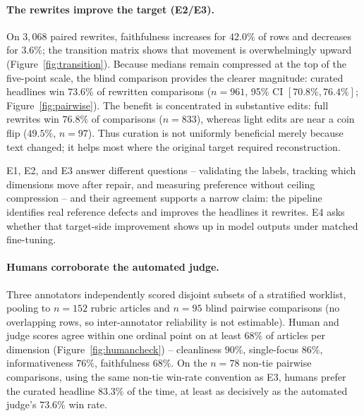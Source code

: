\documentclass[11pt]{article}
\begin{document}
\paragraph{The rewrites improve the target (E2/E3).}
On $3{,}068$ paired rewrites, faithfulness increases for $42.0\%$ of rows and decreases for $3.6\%$;
the transition matrix shows that movement is overwhelmingly upward (Figure~\ref{fig:transition}).
Because medians remain compressed at the top of the five-point scale, the blind comparison provides
the clearer magnitude: curated headlines win $73.6\%$ of rewritten comparisons
($n=961$, 95\% CI $[70.8\%,76.4\%]$; Figure~\ref{fig:pairwise}). The benefit is concentrated in
substantive edits: full rewrites win $76.8\%$ of comparisons ($n=833$), whereas light edits are near
a coin flip ($49.5\%$, $n=97$).
Thus curation is not uniformly beneficial merely because text changed; it helps most where the original
target required reconstruction.

E1, E2, and E3 answer different questions -- validating the labels, tracking which dimensions move after
repair, and measuring preference without ceiling compression -- and their agreement supports a narrow
claim: the pipeline identifies real reference defects and improves the headlines it rewrites. E4 asks
whether that target-side improvement shows up in model outputs under matched fine-tuning.

\paragraph{Humans corroborate the automated judge.}
Three annotators independently scored disjoint subsets of a stratified worklist, pooling to
$n=152$ rubric articles and $n=95$ blind pairwise comparisons (no overlapping rows, so
inter-annotator reliability is not estimable). Human and judge scores agree within one ordinal
point on at least $68\%$ of articles per dimension (Figure~\ref{fig:humancheck}) -- cleanliness
$90\%$, single-focus $86\%$, informativeness $76\%$, faithfulness $68\%$. On the $n=78$ non-tie
pairwise comparisons, using the same non-tie win-rate convention as E3, humans prefer the curated
headline $83.3\%$ of the time, at least as decisively as the automated judge's $73.6\%$ win rate.
\end{document}
